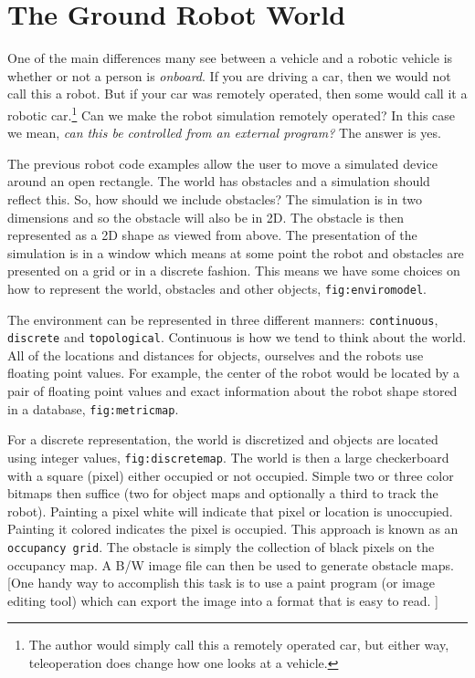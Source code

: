 \hypertarget{the-ground-robot-world}{%
\section{The Ground Robot World}\label{the-ground-robot-world}}

One of the main differences many see between a vehicle and a robotic
vehicle is whether or not a person is \emph{onboard}. If you are driving
a car, then we would not call this a robot. But if your car was remotely
operated, then some would call it a robotic car.\footnote{The author
  would simply call this a remotely operated car, but either way,
  teleoperation does change how one looks at a vehicle.} Can we make the
robot simulation remotely operated? In this case we mean, \emph{can this
be controlled from an external program?} The answer is yes.

The previous robot code examples allow the user to move a simulated
device around an open rectangle. The world has obstacles and a
simulation should reflect this. So, how should we include obstacles? The
simulation is in two dimensions and so the obstacle will also be in 2D.
The obstacle is then represented as a 2D shape as viewed from above. The
presentation of the simulation is in a window which means at some point
the robot and obstacles are presented on a grid or in a discrete
fashion. This means we have some choices on how to represent the world,
obstacles and other objects, \texttt{fig:enviromodel}.

The environment can be represented in three different manners:
\texttt{continuous}, \texttt{discrete} and \texttt{topological}.
Continuous is how we tend to think about the world. All of the locations
and distances for objects, ourselves and the robots use floating point
values. For example, the center of the robot would be located by a pair
of floating point values and exact information about the robot shape
stored in a database, \texttt{fig:metricmap}.

For a discrete representation, the world is discretized and objects are
located using integer values, \texttt{fig:discretemap}. The world is
then a large checkerboard with a square (pixel) either occupied or not
occupied. Simple two or three color bitmaps then suffice (two for object
maps and optionally a third to track the robot). Painting a pixel white
will indicate that pixel or location is unoccupied. Painting it colored
indicates the pixel is occupied. This approach is known as an
\texttt{occupancy
grid}. The obstacle is simply the collection of black pixels on the
occupancy map. A B/W image file can then be used to generate obstacle
maps. {[}One handy way to accomplish this task is to use a paint program
(or image editing tool) which can export the image into a format that is
easy to read. {]}

